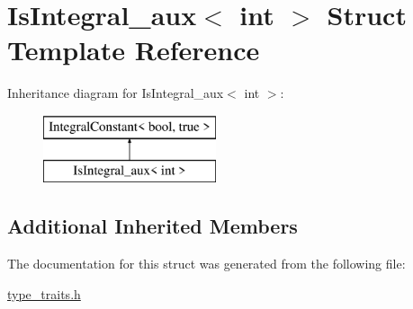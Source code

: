 \hypertarget{struct_is_integral__aux_3_01int_01_4}{}\section{Is\+Integral\+\_\+aux$<$ int $>$ Struct Template Reference}
\label{struct_is_integral__aux_3_01int_01_4}
Inheritance diagram for Is\+Integral\+\_\+aux$<$ int $>$\+:\begin{figure}[H]
\begin{center}
\leavevmode
\includegraphics[height=2.000000cm]{struct_is_integral__aux_3_01int_01_4}
\end{center}
\end{figure}
\subsection*{Additional Inherited Members}


The documentation for this struct was generated from the following file\+:\begin{DoxyCompactItemize}
\item 
\hyperlink{type__traits_8h}{type\+\_\+traits.\+h}\end{DoxyCompactItemize}
